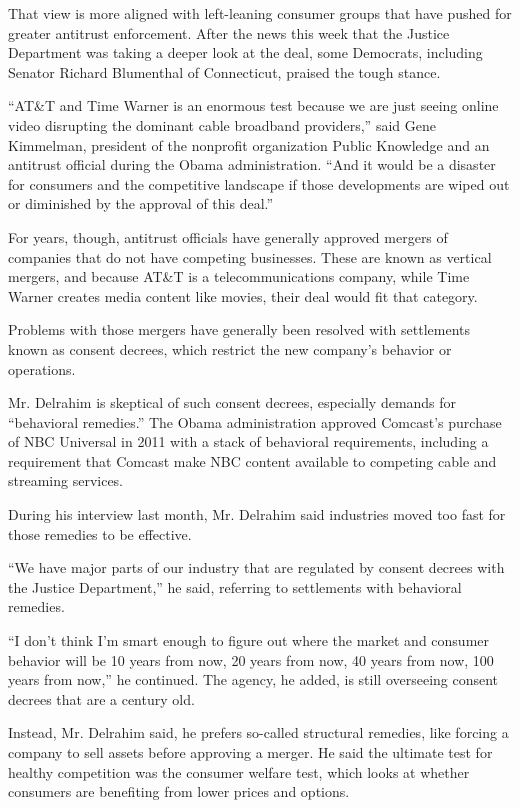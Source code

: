 That view is more aligned with left-leaning consumer groups that have
pushed for greater antitrust enforcement. After the news this week that
the Justice Department was taking a deeper look at the deal, some
Democrats, including Senator Richard Blumenthal of Connecticut, praised
the tough stance.

``AT\&T and Time Warner is an enormous test because we are just seeing
online video disrupting the dominant cable broadband providers,'' said
Gene Kimmelman, president of the nonprofit organization Public Knowledge
and an antitrust official during the Obama administration. ``And it
would be a disaster for consumers and the competitive landscape if those
developments are wiped out or diminished by the approval of this deal.''

For years, though, antitrust officials have generally approved mergers
of companies that do not have competing businesses. These are known as
vertical mergers, and because AT\&T is a telecommunications company,
while Time Warner creates media content like movies, their deal would
fit that category.

Problems with those mergers have generally been resolved with
settlements known as consent decrees, which restrict the new company's
behavior or operations.

Mr. Delrahim is skeptical of such consent decrees, especially demands
for ``behavioral remedies.'' The Obama administration approved Comcast's
purchase of NBC Universal in 2011 with a stack of behavioral
requirements, including a requirement that Comcast make NBC content
available to competing cable and streaming services.

During his interview last month, Mr. Delrahim said industries moved too
fast for those remedies to be effective.

``We have major parts of our industry that are regulated by consent
decrees with the Justice Department,'' he said, referring to settlements
with behavioral remedies.

``I don't think I'm smart enough to figure out where the market and
consumer behavior will be 10 years from now, 20 years from now, 40 years
from now, 100 years from now,'' he continued. The agency, he added, is
still overseeing consent decrees that are a century old.

Instead, Mr. Delrahim said, he prefers so-called structural remedies,
like forcing a company to sell assets before approving a merger. He said
the ultimate test for healthy competition was the consumer welfare test,
which looks at whether consumers are benefiting from lower prices and
options.

